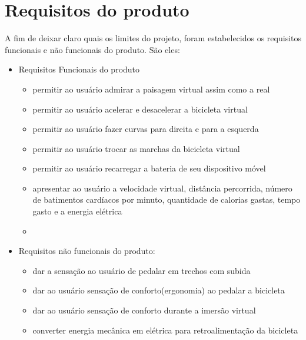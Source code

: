\chapter[Requisitos do produto]{Requisitos do produto}

A fim de deixar claro quais os limites do projeto, foram estabelecidos os requisitos funcionais e não funcionais do produto. São eles:
\begin{itemize}
	\item Requisitos Funcionais do produto
		\begin{itemize}
		\item permitir ao usuário admirar a paisagem virtual assim como a real
		\item permitir ao usuário acelerar e desacelerar a bicicleta virtual
		\item permitir ao usuário fazer curvas para direita e para a esquerda
		\item permitir ao usuário trocar as marchas da bicicleta virtual
		\item permitir ao usuário recarregar a bateria de seu dispositivo móvel
		\item apresentar ao usuário a velocidade virtual, distância percorrida, número de batimentos cardíacos por minuto, quantidade de calorias gastas, tempo gasto e a energia elétrica
		\item 

		\end{itemize}
	\item Requisitos não funcionais do produto:
		\begin{itemize}
		\item dar a sensação ao usuário de pedalar em trechos com subida
		\item dar ao usuário sensação de conforto(ergonomia) ao pedalar a bicicleta
		\item dar ao usuário sensação de conforto durante a imersão virtual
		\item converter energia mecânica em elétrica para retroalimentação da bicicleta
		\end{itemize}
\end{itemize}